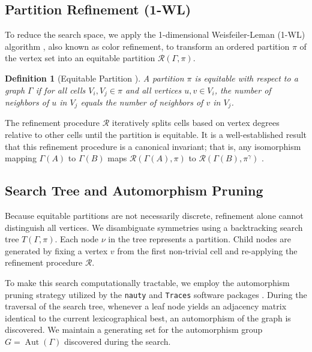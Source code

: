 \documentclass[reqno]{amsart}
\numberwithin{equation}{section}
\newtheorem{definition}[theorem]{Definition}
\begin{document}
\subsection{Partition Refinement (1-WL)}\label{sub:partitionrefinement}

To reduce the search space, we apply the 1-dimensional Weisfeiler-Leman (1-WL) algorithm \cite{weisfeiler1968reduction}, also known as color refinement, to transform an ordered partition $\pi$ of the vertex set into an equitable partition $\mathcal{R}(\Gamma, \pi)$.

\begin{definition}[Equitable Partition \cite{McKay1981}]
A partition $\pi$ is equitable with respect to a graph $\Gamma$ if for all cells $V_i, V_j \in \pi$ and all vertices $u, v \in V_i$, the number of neighbors of $u$ in $V_j$ equals the number of neighbors of $v$ in $V_j$.
\end{definition}

The refinement procedure $\mathcal{R}$ iteratively splits cells based on vertex degrees relative to other cells until the partition is equitable. It is a well-established result that this refinement procedure is a canonical invariant; that is, any isomorphism mapping $\Gamma(A)$ to $\Gamma(B)$ maps $\mathcal{R}(\Gamma(A), \pi)$ to $\mathcal{R}(\Gamma(B), \pi^\gamma)$ \cite{McKay1981}.

\subsection{Search Tree and Automorphism Pruning}\label{sub:searchtree}

Because equitable partitions are not necessarily discrete, refinement alone cannot distinguish all vertices. We disambiguate symmetries using a backtracking search tree $T(\Gamma, \pi)$. Each node $\nu$ in the tree represents a partition. Child nodes are generated by fixing a vertex $v$ from the first non-trivial cell and re-applying the refinement procedure $\mathcal{R}$.

To make this search computationally tractable, we employ the automorphism pruning strategy utilized by the \texttt{nauty} and \texttt{Traces} software packages \cite{McKay2014}. During the traversal of the search tree, whenever a leaf node yields an adjacency matrix identical to the current lexicographical best, an automorphism of the graph is discovered. We maintain a generating set for the automorphism group $G = \operatorname{Aut}(\Gamma)$ discovered during the search.
\end{document}
